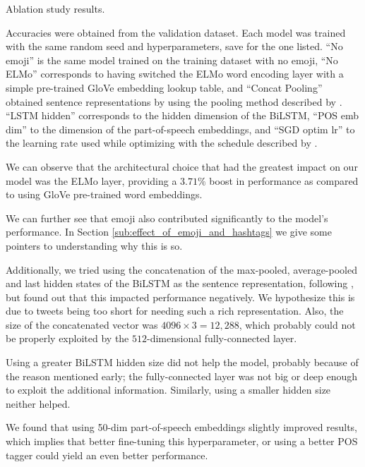 \documentclass[11pt,a4paper]{article}
\begin{document}
\begin{table}[!h]
    \caption{Ablation study results.}
    \vspace{-0.4cm}
    \caption*{
        \footnotesize Accuracies were obtained from the
        validation dataset. Each model was trained with the same random seed and
        hyperparameters, save for the one listed. ``No emoji'' is the same model
        trained on the training dataset with no emoji, ``No ELMo'' corresponds
        to having switched the ELMo word encoding layer with a simple
        pre-trained GloVe embedding lookup table, and ``Concat Pooling''
        obtained sentence representations by using the pooling method described
        by \citet{howard2018universal}. ``LSTM hidden'' corresponds to the
        hidden dimension of the BiLSTM, ``POS emb dim'' to the dimension of the
        part-of-speech embeddings, and ``SGD optim lr'' to the learning rate
        used while optimizing with the schedule described by \citet{conneau2017supervised}.}

    \label{table:ablation}

\end{table}



We can observe that the architectural choice that had the greatest impact on our
model was the ELMo layer, providing a $3.71\%$ boost in performance as compared
to using GloVe pre-trained word embeddings.

We can further see that emoji also contributed significantly to the model's
performance. In Section \ref{sub:effect_of_emoji_and_hashtags} we give some
pointers to understanding why this is so.  

Additionally, we tried using the concatenation of the max-pooled, average-pooled
and last hidden states of the BiLSTM as the sentence representation, following
\citet{howard2018universal}, but found out that this impacted performance
negatively. We hypothesize this is due to tweets being too short for needing
such a rich representation. Also, the size of the concatenated vector was
$4096\times3=12,288$, which probably could not be properly exploited by the
$512$-dimensional fully-connected layer.

Using a greater BiLSTM hidden size did not help the model, probably because of
the reason mentioned early; the fully-connected layer was not big or deep enough
to exploit the additional information. Similarly, using a smaller hidden size
neither helped.

We found that using 50-dim part-of-speech embeddings slightly improved results,
which implies that better fine-tuning this hyperparameter, or using a better POS
tagger could yield an even better performance.
\end{document}
